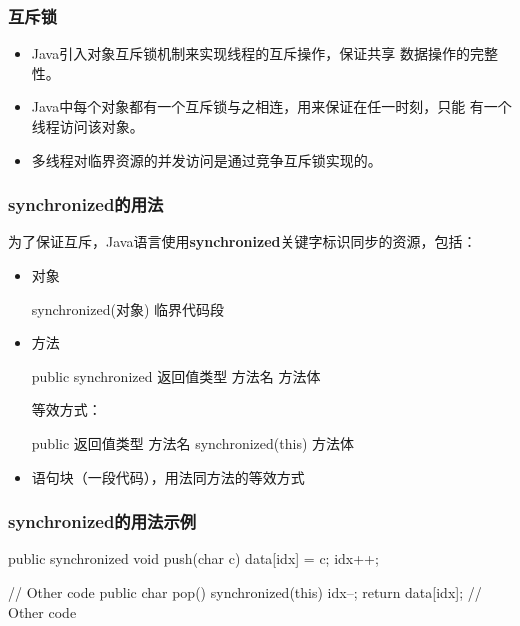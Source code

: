 \begin{frame}[fragile] %
  \frametitle{互斥锁}
  
  \begin{itemize}
  \item Java引入对象{\Red\hei 互斥锁}机制来实现线程的互斥操作，保证共享
    数据操作的完整性。
  \item Java中每个对象都有一个互斥锁与之相连，用来保证在任一时刻，只能
    有一个线程访问该对象。
  \item 多线程对临界资源的并发访问是通过竞争互斥锁实现的。
  \end{itemize}
\end{frame}

\begin{frame}[fragile]
  \frametitle{synchronized的用法}

  为了保证互斥，Java语言使用{\bf\Red synchronized}关键字标识同步的{\hei\Blue 资源}，包括：

  \begin{itemize}
  \item 对象
    \begin{javaCode}
      synchronized(对象) {
        临界代码段
      }
    \end{javaCode}
  \item 方法
    \begin{javaCode}
      public synchronized 返回值类型 方法名 {
        方法体
      }
    \end{javaCode}

    等效方式：
    
    \begin{javaCode}
      public 返回值类型 方法名 {
        synchronized(this) {
          方法体
        }
      }
    \end{javaCode}
  \item 语句块（一段代码），用法同方法的等效方式
  \end{itemize}
\end{frame}


\begin{frame}[fragile] %
  \frametitle{synchronized的用法示例}


  \begin{javaCode}
    public synchronized void push(char c) {
      data[idx] = c;
      idx++;
    }
  \end{javaCode}

  
  \begin{javaCode}
    // Other code
    public char pop() {
      synchronized(this) {
        idx--;
        return data[idx];
      }
      // Other code
    }
  \end{javaCode}
\end{frame}

